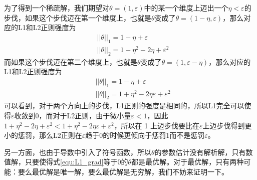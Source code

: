 为了得到一个稀疏解，我们期望对$\theta = (1, \varepsilon)$中的某一个维度上迈出一个$\eta < \varepsilon$的步伐，如果这个步伐迈在第一个维度上，也就是$\theta$变成了$\theta = (1-\eta, \varepsilon)$，那么对应的L1和L2正则强度为
\begin{equation}
\begin{split}
	&||\theta||_1 = 1 - \eta + \varepsilon\\
	&||\theta||_2 = 1 + \eta^2 - 2\eta + \varepsilon^2
\end{split}
\end{equation}
而如果这个步伐迈在第二个维度上，也就是$\theta$变成了$\theta = (1, \varepsilon - \eta)$，那么对应的L1和L2正则强度为
\begin{equation}
\begin{split}
	&||\theta||_1 = 1 - \eta + \varepsilon\\
	&||\theta||_2 = 1 + \eta^2 - 2\eta\varepsilon + \varepsilon^2
\end{split}
\end{equation}
可以看到，对于两个方向上的步伐，L1正则的强度是相同的，所以L1完全可以使得$\varepsilon$收敛到0，而对于L2正则，由于微小量$\varepsilon < 1$，因此$1 + \eta^2 - 2\eta + \varepsilon^2 < 1 + \eta^2 - 2\eta\varepsilon + \varepsilon^2$，所以在 1 上迈步伐要比在$\varepsilon$上迈步伐得到更小的惩罚，那么L2正则在$\varepsilon$趋于0的时候更倾向于惩罚1而不是惩罚$\varepsilon$。

另一方面，也由于导数中引入了符号函数，所以$\theta$的参数估计没有解析解，只有数值解，只要使得式\ref{equ:L1_grad}等于0的$\theta$都是最优解。对于最优解，只有两种可能：要么最优解是唯一解，要么最优解是无穷解，我们不妨来证明一下。


